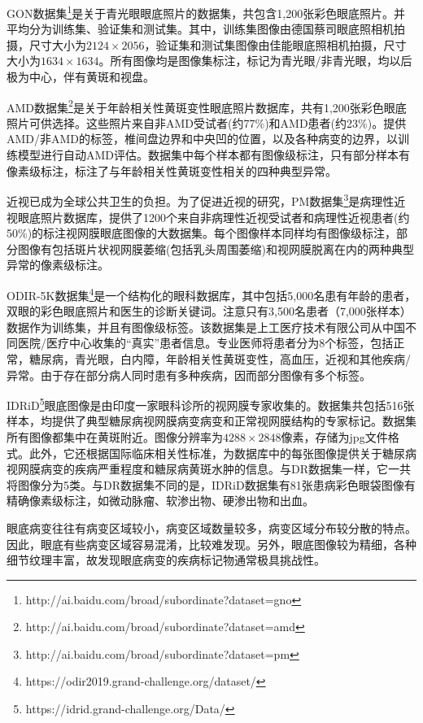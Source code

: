 GON数据集\footnote{http://ai.baidu.com/broad/subordinate?dataset=gno}是关于青光眼眼底照片的数据集，共包含1,200张彩色眼底照片。并平均分为训练集、验证集和测试集。其中，训练集图像由德国蔡司眼底照相机拍摄，尺寸大小为$2124\times 2056$，验证集和测试集图像由佳能眼底照相机拍摄，尺寸大小为$1634\times 1634 $。所有图像均是图像集标注，标记为青光眼/非青光眼，均以后极为中心，伴有黄斑和视盘。

AMD数据集\footnote{http://ai.baidu.com/broad/subordinate?dataset=amd}是关于年龄相关性黄斑变性眼底照片数据库，共有1,200张彩色眼底照片可供选择。这些照片来自非AMD受试者(约77\%)和AMD患者(约23\%)。提供AMD/非AMD的标签，椎间盘边界和中央凹的位置，以及各种病变的边界，以训练模型进行自动AMD评估。数据集中每个样本都有图像级标注，只有部分样本有像素级标注，标注了与年龄相关性黄斑变性相关的四种典型异常。

近视已成为全球公共卫生的负担。为了促进近视的研究，PM数据集\footnote{http://ai.baidu.com/broad/subordinate?dataset=pm}是病理性近视眼底照片数据库，提供了1200个来自非病理性近视受试者和病理性近视患者(约50\%)的标注视网膜眼底图像的大数据集。每个图像样本同样均有图像级标注，部分图像有包括斑片状视网膜萎缩(包括乳头周围萎缩)和视网膜脱离在内的两种典型异常的像素级标注。

ODIR-5K数据集\footnote{https://odir2019.grand-challenge.org/dataset/}是一个结构化的眼科数据库，其中包括5,000名患有年龄的患者，双眼的彩色眼底照片和医生的诊断关键词。注意只有3,500名患者（7,000张样本）数据作为训练集，并且有图像级标签。该数据集是上工医疗技术有限公司从中国不同医院/医疗中心收集的“真实”患者信息。专业医师将患者分为8个标签，包括正常，糖尿病，青光眼，白内障，年龄相关性黄斑变性，高血压，近视和其他疾病/异常。由于存在部分病人同时患有多种疾病，因而部分图像有多个标签。

IDRiD\footnote{https://idrid.grand-challenge.org/Data/}眼底图像是由印度一家眼科诊所的视网膜专家收集的。数据集共包括516张样本，均提供了典型糖尿病视网膜病变病变和正常视网膜结构的专家标记。数据集所有图像都集中在黄斑附近。图像分辨率为$4288\times 2848$像素，存储为jpg文件格式。此外，它还根据国际临床相关性标准，为数据库中的每张图像提供关于糖尿病视网膜病变的疾病严重程度和糖尿病黄斑水肿的信息。与DR数据集一样，它一共将图像分为5类。与DR数据集不同的是，IDRiD数据集有81张患病彩色眼袋图像有精确像素级标注，如微动脉瘤、软渗出物、硬渗出物和出血。

眼底病变往往有病变区域较小，病变区域数量较多，病变区域分布较分散的特点。因此，眼底有些病变区域容易混淆，比较难发现。另外，眼底图像较为精细，各种细节纹理丰富，故发现眼底病变的疾病标记物通常极具挑战性。

